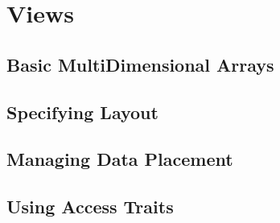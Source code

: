 
\chapter{Views}
\section{Basic MultiDimensional Arrays}
\section{Specifying Layout}
\section{Managing Data Placement}
\section{Using Access Traits}